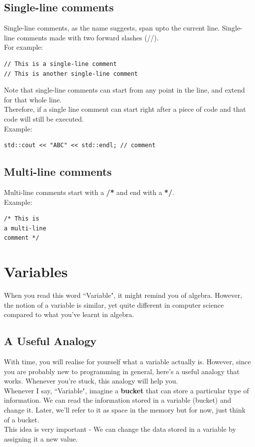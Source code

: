 \documentclass[letterpaper, 12pt]{book}
\begin{document}
\subsection{Single-line comments}
Single-line comments, as the name suggests, span upto the current line. Single-line comments made with two forward slashes (//).\\
For example:
\begin{lstlisting}
// This is a single-line comment
// This is another single-line comment
\end{lstlisting}
Note that single-line comments can start from any point in the line, and extend for that whole line.\\
Therefore, if a single line comment can start right after a piece of code and that code will still be executed.\\
Example:
\begin{lstlisting}
std::cout << "ABC" << std::endl; // comment 
\end{lstlisting}
\subsection{Multi-line comments}
Multi-line comments start with a \textbf{/*} and end with a \textbf{*/}.\\
Example:
\begin{lstlisting}
/* This is
a multi-line
comment */
\end{lstlisting}
\section{Variables}
When you read this word ``Variable", it might remind you of algebra. However, the notion of a variable is similar, yet quite different in computer science compared to what you've learnt in algebra.\\
\subsection{A Useful Analogy}
With time, you will realise for yourself what a variable actually is. However, since you are probably new to programming in general, here's a useful analogy that works. Whenever you're stuck, this analogy will help you.\\
Whenever I say, ``Variable", imagine a \textbf{bucket} that can store a particular type of information. We can read the information stored in a variable (bucket) and change it. Later, we'll refer to it as space in the memory but for now, just think of a bucket.\\
This idea is very important - We can change the data stored in a variable by assigning it a new value.
\end{document}
